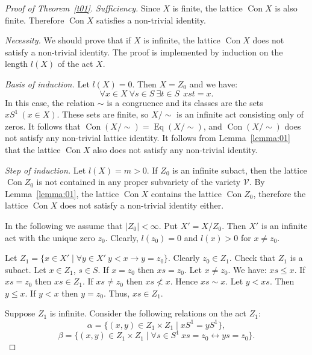 \documentclass{birkau}
\numberwithin{equation}{section}
\theoremstyle{plain}
\theoremstyle{definition}
\DeclareMathOperator{\Con}{Con}
\DeclareMathOperator{\Eq}{Eq}
\begin{document}
	\begin{proof}[Proof of Theorem~\ref{t01}]
	    \textit{Sufficiency.} Since $X$ is finite, the lattice $\Con X$ is also finite. Therefore $\Con X$ satisfies a non-trivial identity.
	
		\textit{Necessity.} We should prove that if $X$ is infinite, the lattice $\Con X$ does not satisfy a non-trivial identity. The proof is implemented by induction on the length $l(X)$ of the act $X$.
		
		\textit{Basis of induction.} Let $l(X) = 0$. Then $X = Z_0$ and we have: $$ \forall x \in X \ \forall s \in S \ \exists t \in S \ \ xst = x. $$ In this case, the relation $\sim$ is a congruence and its classes are the sets $xS^1\ (x \in X)$. These sets are finite, so ${X}/{\sim}$ is an infinite act consisting only of zeros. It follows that $\Con({X}/{\sim})=\Eq({X}/{\sim})$, and $\Con({X}/{\sim})$ does not satisfy any non-trivial lattice identity. It follows from Lemma~\ref{lemma:01} that the lattice $\Con X$ also does not satisfy any non-trivial identity.
		
		\textit{Step of induction.} Let $l(X) = m > 0$. If $Z_0$ is an infinite subact, then the lattice $\Con Z_0$ is not contained in any proper subvariety of the variety $\mathcal{V}$. By Lemma~\ref{lemma:01}, the lattice $\Con X$ contains the lattice $\Con Z_0$, therefore the lattice $\Con X$ does not satisfy a non-trivial identity either.
		
		In the following we assume that $|Z_0| < \infty$. Put $X'={X}/{Z_0}$. Then $X'$ is an infinite act with the unique zero $z_0$. Clearly,  $l(z_0) = 0$ and $l(x) > 0$ for $x \neq z_0$.
		
		Let $Z_1 = \{x \in X' \mid \forall y  \in X' \ y < x \rightarrow y = z_0\}$. Clearly $z_0 \in Z_1$. Check that $Z_1$ is a subact. Let $x \in Z_1$, $s \in S$. If $x = z_0$ then $xs = z_0$. Let $x \neq z_0$. We have: $xs \leqslant x$. If $xs = z_0$ then $xs \in Z_1$. If $xs \neq z_0$ then $xs \not < x$. Hence $xs \sim x$. Let $y < xs$. Then $y \leqslant x$. If $y < x$ then $y = z_0$. Thus, $xs \in Z_1$.
		
		Suppose $ Z_1 $ is infinite. Consider the following relations on the act $Z_1$: $$ \alpha = \{ (x,y) \in Z_1 \times Z_1 \mid xS^1 = yS^1 \}, $$ $$ \beta = \{ (x,y) \in Z_1 \times Z_1 \mid \forall s \in S^1 \ xs = z_0 \leftrightarrow ys = z_0 \}. $$
		

\end{proof}
\end{document}

